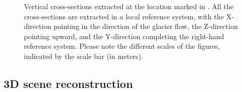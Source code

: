\begin{figure}
\begin{center}
     \hspace{70mm} 
  \end{center}
  \caption{Vertical cross-sections extracted at the location marked in
    .
    All the cross-sections are extracted in a local reference system, with the X-direction pointing in the direction of the glacier flow, the Z-direction pointing upward, and the Y-direction completing the right-hand reference system.
    Please note the different scales of the figures, indicated by the scale bar (in meters).}
  \label{fig:4:sections}
\end{figure}

\subsection{3D scene reconstruction}\label{sec:4:res_3dreconstruction_results}


